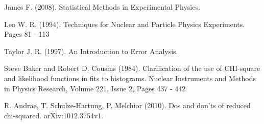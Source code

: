 \documentclass[12pt,a4paper]{report}
\begin{document}
\medskip

\begin{thebibliography}{99}

James F. (2008). Statistical Methods in Experimental Physics.

Leo W. R. (1994). Techniques for Nuclear and Particle Physics Experiments. Pages 81 - 113

Taylor J. R. (1997). An Introduction to Error Analysis. 

Steve Baker and Robert D. Cousins (1984). Clarification of the use of CHI-square and likelihood functions in fits to histograms. Nuclear Instruments and Methods in Physics Research, Volume 221, Issue 2, Pages 437 - 442 

R. Andrae, T. Schulze-Hartung, P. Melchior (2010). Dos and don’ts of reduced chi-squared. arXiv:1012.3754v1. 

\end{thebibliography}
\end{document}
